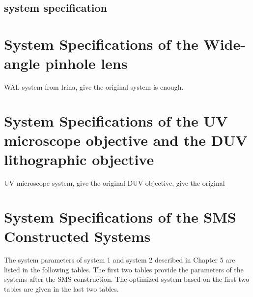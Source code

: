 \section{system specification}



\chapter{System Specifications of the Wide-angle pinhole lens}
 WAL system from Irina, give the original system is enough.
\label{apdx: chapter-3-system-spec}
\chapter{System Specifications of the UV microscope objective and the DUV lithographic objective} 
\label{apdx: chapter-4-system-spec}
UV microscope system, give the original 
DUV objective, give the original

\chapter{System Specifications of the SMS Constructed Systems} 
\label{apdx: chapter-5-system-spec}
\graphicspath{ {./Appendix/figures/} }  %
\captionsetup[figure]{labelfont=bf}
\captionsetup{margin=1.5em}
\captionsetup[table]{labelfont=bf}

The system parameters of system 1 and system 2 described in Chapter 5 are listed in the following tables. The first two tables provide the parameters of the systems after the SMS construction. The optimized system based on the first two tables are given in the last two tables. 

